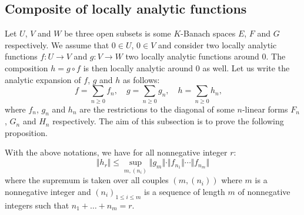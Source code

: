 \documentclass{sig-alternate}
\begin{document}
\begin{comment}
Let $x$ be the unique value such that the left (resp. right) derivative 
of $\varphi$ at $x$ is less than (resp. greater than) or equal to $s$. 
Let $\ell^-$ (resp. $\ell^+$) denote the left (resp. right) derivative 
of $\varphi_1$ at $\varphi_2(x)$ and $n^-$ (resp. $n^+$) denote the left 
(resp. right) derivative of $\varphi_2$ at $x$. On the one hand, $\ell^- 
n^- \leq s \leq \ell^+ n^+$ since $\ell^- n^-$ (resp. $\ell^+ n^+$) 
equals the left (resp. right) derivative of $\varphi$ at $x$). On the 
other hand:
$$\begin{array}{ll}
\varphi_1^\star(u) = \varphi(x) - u \varphi_2(x) & 
\text{for all } u \in [\ell^-,\, \ell^+] \\
\varphi_2^\star(u) = \varphi_2(x) - u x & 
\text{for all } u \in [n^-,\, n^+] \\
\varphi^\star(u) = \varphi(x) - u x & 
\text{for all } u \in [\ell^- n^-,\, \ell^+ n^+] \\
\end{array}$$
Therefore, the inequality \eqref{eq:inegvarphi} is an equality for all 
integer $\ell \in [\ell^-, \ell^+]$ and all sequences of integers 
$(n_i)_{1 \leq i \leq \ell}$ with $n_i \in [n^-, n^+]$ for all $i$ and 
$n_1 + \cdots + n_\ell = s$. It is then enough to prove that such a 
couple $(\ell, (n_i))$ exists but it is clear.
\end{proof}

\end{comment}

\subsection{Composite of locally analytic functions}

Let $U$, $V$ and $W$ be three open subsets is some $K$-Banach spaces
$E$, $F$ and $G$ respectively. We assume that $0 \in U$, $0 \in V$ and
consider two locally analytic functions $f : U \to V$ and $g : V \to W$ 
two locally analytic functions around $0$. The composition $h = g \circ
f$ is then locally analytic around $0$ as well. Let us write the
analytic expansion of $f$, $g$ and $h$ as follows:
$$f = \sum_{n \geq 0} f_n, \quad 
g = \sum_{n \geq 0} g_n, \quad
h = \sum_{n \geq 0} h_n, \quad$$
where $f_n$, $g_n$ and $h_n$ are the restrictions to the diagonal of 
some $n$-linear forms $F_n$, $G_n$ and $H_n$ respectively. The aim of
this subsection is to prove the following proposition.

\begin{prop}
\label{prop:boundhr}
With the above notations, we have for all nonnegative integer $r$:
$$\Vert h_r \Vert \leq \sup_{m, (n_i)}
  \Vert g_m \Vert \cdot \Vert f_{n_1} \Vert \cdots \Vert f_{n_m} \Vert$$
where the supremum is taken over all couples $(m, (n_i))$ where $m$
is a nonnegative integer and $(n_i)_{1 \leq i \leq m}$ is a sequence of
length $m$ of nonnegative integers such that $n_1 + \ldots + n_m = r$.
\end{prop}
\end{document}
